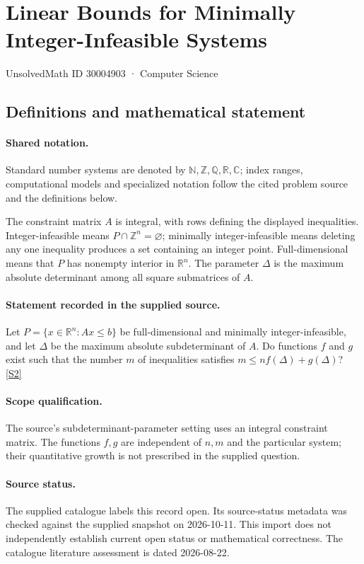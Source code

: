 \documentclass[11pt]{article}
\newcommand{\sref}[2]{\hyperlink{source:#1:#2}{[S#2]}}
\begin{document}
\setcounter{section}{30004902}
\section{Linear Bounds for Minimally Integer-Infeasible Systems}\label{30004903}
{\small\sffamily UnsolvedMath ID 30004903 · Computer Science}
\subsection{Definitions and mathematical statement}

\paragraph{Shared notation.}Standard number systems are denoted by $\mathbb N,\mathbb Z,\mathbb Q,\mathbb R,\mathbb C$; index ranges, computational models and specialized notation follow the cited problem source and the definitions below.


The constraint matrix $A$ is integral, with rows defining the displayed inequalities. Integer-infeasible means $P\cap\mathbb Z^n=\varnothing$; minimally integer-infeasible means deleting any one inequality produces a set containing an integer point. Full-dimensional means that $P$ has nonempty interior in $\mathbb R^n$. The parameter $\Delta$ is the maximum absolute determinant among all square submatrices of $A$.
\paragraph{Statement recorded in the supplied source.}
Let $P=\{x\in\mathbb R^n:Ax\leq b\}$ be full-dimensional and minimally integer-infeasible, and let $\Delta$ be the maximum absolute subdeterminant of $A$. Do functions $f$ and $g$ exist such that the number $m$ of inequalities satisfies $m\leq nf(\Delta)+g(\Delta)$? \sref{30004903}{2}
\paragraph{Scope qualification.}
The source's subdeterminant-parameter setting uses an integral constraint matrix. The functions $f,g$ are independent of $n,m$ and the particular system; their quantitative growth is not prescribed in the supplied question.
\paragraph{Source status.}
The supplied catalogue labels this record open. Its source-status metadata was checked against the supplied snapshot on 2026-10-11. This import does not independently establish current open status or mathematical correctness. The catalogue literature assessment is dated 2026-08-22.
\end{document}
